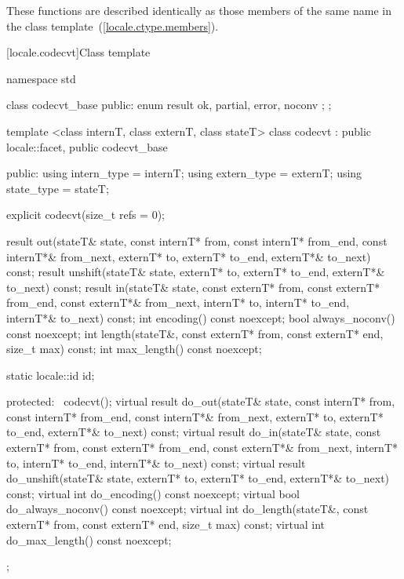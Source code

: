 These functions are described identically as those members of the
same name in the
class template~(\ref{locale.ctype.members}).

[locale.codecvt]{Class template }

%
\begin{codeblock}
namespace std {
  class codecvt_base {
  public:
    enum result { ok, partial, error, noconv };
  };

  template <class internT, class externT, class stateT>
  class codecvt : public locale::facet, public codecvt_base {
  public:
    using intern_type = internT;
    using extern_type = externT;
    using state_type  = stateT;

    explicit codecvt(size_t refs = 0);

    result out(stateT& state,
               const internT* from, const internT* from_end, const internT*& from_next,
               externT*   to,       externT* to_end, externT*& to_next) const;
    result unshift(stateT& state,
                   externT*   to,        externT* to_end, externT*& to_next) const;
    result in(stateT& state,
              const externT* from, const externT* from_end, const externT*& from_next,
              internT*   to,       internT* to_end, internT*& to_next) const;
    int encoding() const noexcept;
    bool always_noconv() const noexcept;
    int length(stateT&, const externT* from, const externT* end,
               size_t max) const;
    int max_length() const noexcept;

    static locale::id id;

  protected:
    ~codecvt();
    virtual result do_out(stateT& state,
                          const internT* from, const internT* from_end, const internT*& from_next,
                          externT* to,         externT* to_end, externT*& to_next) const;
    virtual result do_in(stateT& state,
                         const externT* from, const externT* from_end, const externT*& from_next,
                         internT* to,         internT* to_end, internT*& to_next) const;
    virtual result do_unshift(stateT& state,
                              externT* to,         externT* to_end, externT*& to_next) const;
    virtual int do_encoding() const noexcept;
    virtual bool do_always_noconv() const noexcept;
    virtual int do_length(stateT&, const externT* from,
                          const externT* end, size_t max) const;
    virtual int do_max_length() const noexcept;
  };
}
\end{codeblock}

